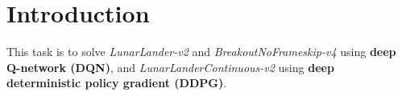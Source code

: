 \chapter{Introduction}
\indent
	This task is to solve \textit{LunarLander-v2} and \textit{BreakoutNoFrameskip-v4} using \textbf{deep Q-network (DQN)}, and
	\textit{LunarLanderContinuous-v2} using \textbf{deep deterministic policy gradient (DDPG)}.